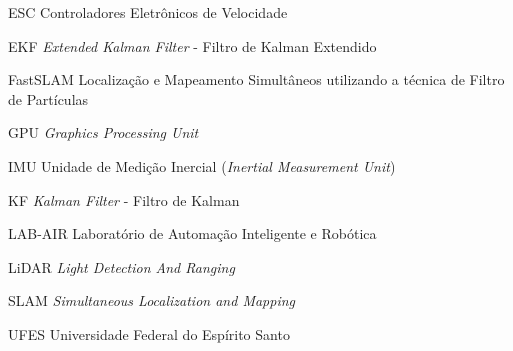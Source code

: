 \documentclass[
	12pt,				%
	openright,			%
	oneside,			%
	a4paper,			%
	chapter=TITLE,		%
	english,			%
	french,				%
	spanish,			%
	brazil				%
	]{abntex2}
\begin{document}
\begin{siglas}
\item[ESC] Controladores Eletrônicos de Velocidade
\item[EKF] \textit{Extended Kalman Filter} - Filtro de Kalman Extendido
\item[FastSLAM] Localização e Mapeamento Simultâneos utilizando a técnica de Filtro de Partículas
\item[GPU] \textit{Graphics Processing Unit} 
\item[IMU]  Unidade de Medição Inercial (\textit{Inertial Measurement Unit})
\item[KF] \textit{Kalman Filter} - Filtro de Kalman
\item[LAB-AIR] Laboratório de Automação Inteligente e Robótica
\item[LiDAR] \textit{Light Detection And Ranging}
\item[SLAM] \textit{Simultaneous Localization and Mapping}
\item[UFES] Universidade Federal do Espírito Santo
\end{siglas}

\end{document}

